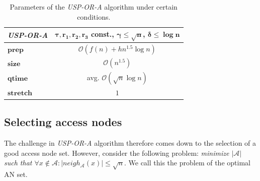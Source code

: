 \documentclass{svk_long_en}
\begin{document}
		\begin{table}[H]
			\centering
			\small
			\begin{tabular}{l|c}
				\cellcolor{oracle-clr} \textit{\textbf{USP-OR-A}} & 
				\cellcolor{oracle-clr} \parbox{3cm}{\textbf{$\bm{\tau, r_{1}, r_{2}, r_{3}}$ const., $\bm{\gamma \leq \sqrt{n}}$, $\bm{\delta \leq \log n}$}} \\ [1.5ex]
				\hline
				 $\bm{prep}$ & $\mathcal{O}(f(n) + h n^{1.5} \log n)$ \\
				 $\bm{size}$ & $\mathcal{O}(n^{1.5})$ \\
				 $\bm{qtime}$ & avg. $\mathcal{O}(\sqrt{n} \log n)$ \\
				 $\bm{stretch}$ & $1$ \\
			\end{tabular}
			\caption{\label{tab:uspora-cond} Parameters of the \textit{USP-OR-A} algorithm under certain conditions.}
		\end{table}
		
	\subsection{Selecting access nodes}
	
		The challenge in \textit{USP-OR-A} algorithm therefore comes down to the selection of a good access node set. However, consider the following problem: \textit{minimize $|\mathcal{A}|$ such that $\forall x \not \in \mathcal{A}: |neigh_{\mathcal{A}}(x)| \leq \sqrt{n}$}. We call this the problem of the optimal AN set.
		
\end{document}
